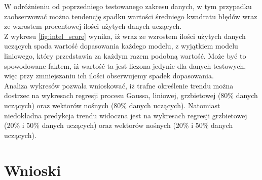 W odróżnieniu od poprzedniego testowanego zakresu danych, w tym przypadku zaobserwować można tendencję spadku wartości średniego kwadratu błędów wraz ze wzrostem procentowej ilości użytych danych uczących.\\

Z wykresu \ref{fig:intel_score} wynika, iż wraz ze wzrostem ilości użytych danych uczących spada wartość dopasowania każdego modelu, z wyjątkiem modelu liniowego, który przedstawia za każdym razem podobną wartość.
Może być to spowodowane faktem, iż wartość ta jest liczona jedynie dla danych testowych, więc przy zmniejszaniu ich ilości obserwujemy spadek dopasowania.\\

Analiza wykresów pozwala wnioskować, iż trafne określenie trendu można dostrzec na wykresach regresji procesu Gaussa, liniowej, grzbietowej (80\% danych uczących) oraz wektorów nośnych (80\% danych uczących).
Natomiast niedokładna predykcja trendu widoczna jest na wykresach regresji grzbietowej (20\% i 50\% danych uczących) oraz wektorów nośnych (20\% i 50\% danych uczących).\\

\section{Wnioski}

